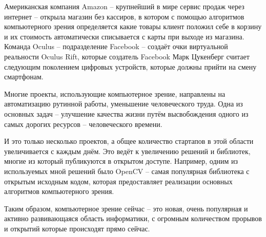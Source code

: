 Американская компания Amazon -- крупнейший в мире сервис продаж через интернет -- открыла магазин без кассиров, в котором с помощью алгоритмов компьютерного зрения определяется какие товары клиент положил себе в корзину и их стоимость автоматически списывается с карты при выходе из магазина. Команда Oculus -- подразделение Facebook -- создаёт очки виртуальной реальности Oculus Rift, которые создатель Facebook Марк Цукенберг считает следующим поколением цифровых устройств, которые должны прийти на смену смартфонам.

Многие проекты, использующие компьютерное зрение, направлены на автоматизацию рутинной работы, уменьшение человеческого труда. Одна из основных задач -- улучшение качества жизни путём высвобождения одного из самых дорогих ресурсов -- человеческого времени.

И это только несколько проектов, а общее количество стартапов в этой области увеличивается с каждым днём. Это ведёт к увеличению решений и библиотек, многие из который публикуются в открытом доступе. Например, одним из используемых мной решений было OpenCV -- самая популярная библиотека с открытым исходным кодом, которая предоставляет реализации основных алгоритмов компьютерного зрения.

Таким образом, компьютерное зрение сейчас -- это новая, очень популярная и активно развивающаяся область информатики, с огромным количеством прорывов и открытий которые происходят прямо сейчас.

